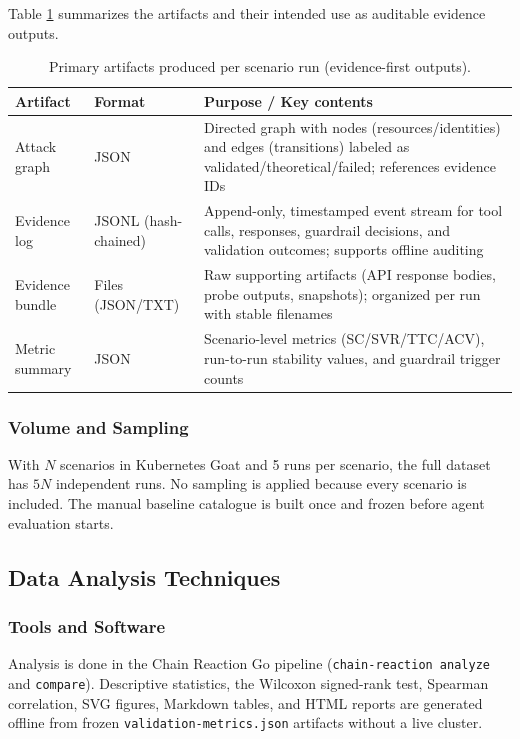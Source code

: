 \documentclass[conference]{IEEEtran}
\begin{document}
Table \ref{tab:artifacts} summarizes the artifacts and their intended use as auditable evidence outputs.

\begin{table}[t!]
\centering
\caption{Primary artifacts produced per scenario run (evidence-first outputs).}
\label{tab:artifacts}
\scriptsize
\setlength{\tabcolsep}{6pt}
\renewcommand{\arraystretch}{1.2}
\begin{tabularx}{\textwidth}{l l X}
\toprule
\textbf{Artifact} & \textbf{Format} & \textbf{Purpose / Key contents} \\
\midrule
Attack graph & JSON & Directed graph with nodes (resources/identities) and edges (transitions) labeled as validated/theoretical/failed; references evidence IDs \\
Evidence log & JSONL (hash-chained) & Append-only, timestamped event stream for tool calls, responses, guardrail decisions, and validation outcomes; supports offline auditing \\
Evidence bundle & Files (JSON/TXT) & Raw supporting artifacts (API response bodies, probe outputs, snapshots); organized per run with stable filenames \\
Metric summary & JSON & Scenario-level metrics (SC/SVR/TTC/ACV), run-to-run stability values, and guardrail trigger counts \\
\bottomrule
\end{tabularx}
\end{table}

\subsubsection{Volume and Sampling}
With $N$ scenarios in Kubernetes Goat and 5 runs per scenario, the full dataset has $5N$ independent runs. No sampling is applied because every scenario is included. The manual baseline catalogue is built once and frozen before agent evaluation starts.

\subsection{Data Analysis Techniques}

\subsubsection{Tools and Software}
Analysis is done in the Chain Reaction Go pipeline (\texttt{chain-reaction analyze} and \texttt{compare}). Descriptive statistics, the Wilcoxon signed-rank test, Spearman correlation, SVG figures, Markdown tables, and HTML reports are generated offline from frozen \texttt{validation-metrics.json} artifacts without a live cluster.
\end{document}
